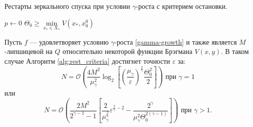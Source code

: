      \begin{algorithm}[htp]
        \caption{Рестарты зеркального спуска при условии $\gamma$-роста с критерием остановки.}
        \label{alg:rest_criteria}
        $p \gets 0$\;
        $\Theta_0 \geq \min\limits_{x_* \in X_*}{V(x_*,x_0^0)}$\;
    \end{algorithm}
    \begin{theorem}
        Пусть $f$ --- удовлетворяет условию $\gamma$-роста \eqref{gamma-growth} и также является $M$-липшицевой на $Q$ относительно некоторой функции Брэгмана $V(x, y)$. В таком случае Алгоритм \ref{alg:rest_criteria} достигнет точности $\varepsilon$ за:
        \begin{equation}
           N = \mathcal{O} \left( \frac{4 M^2}{\mu_{\gamma}^2} \log_2{\left[\left(\frac{\mu_{\gamma}}{\varepsilon}\right)^{\frac{2}{\gamma}} \frac{\Theta_0^2}{2}\right]}\right) \text{ при } \gamma = 1
       \end{equation}
       или
       \begin{equation}
           N = \mathcal{O}\left( \frac{2 M^2 }{2^{\gamma - 1} - 1}\left[ \frac{2}{\mu_{\gamma}^{\frac{2}{\gamma}}}\varepsilon^{\frac{2}{\gamma} - 2} - \frac{2^{\gamma}}{\mu_{\gamma}^2 \Theta_0^{2(\gamma - 1)}} \right] \right) \text{ при } \gamma > 1.
       \end{equation}
    \end{theorem}

